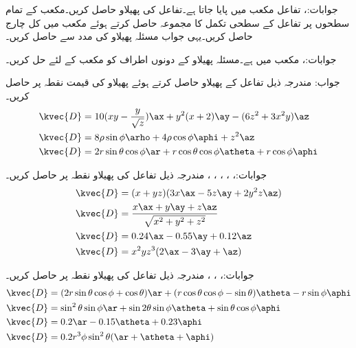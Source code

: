 جوابات:، 
تفاعل  مکعب  میں پایا جاتا ہے۔تفاعل کی پھیلاو  حاصل کریں۔مکعب کے تمام سطحوں پر تفاعل کے سطحی تکمل کا مجموعہ حاصل کرتے ہوئے مکعب میں کل چارج حاصل کریں۔یہی جواب مسئلہ پھیلاو  کی مدد سے حاصل کریں۔

جوابات:، 
مکعب  میں  ہے۔مسئلہ پھیلاو کے دونوں اطراف کو مکعب کے لئے حل کریں۔

جواب:
مندرجہ ذیل تفاعل کے پھیلاو حاصل کرتے ہوئے پھیلاو کی قیمت نقطہ  پر حاصل کریں۔
\begin{align*}
\kvec{D}&=10(xy-\frac{y}{\sqrt{z}})\ax+y^2(x+2)\ay-(6z^2+3x^2y)\az\\
\kvec{D}&=8\rho \sin \phi \arho+4\rho \cos \phi \aphi+z^2\az\\
\kvec{D}&=2 r \sin \theta \cos \phi\ar +r \cos \theta \cos \phi \atheta+r \cos \phi \aphi
\end{align*}

جوابات:، ، ، ، ، 
مندرجہ ذیل تفاعل کی پھیلاو نقطہ  پر حاصل کریں۔
\begin{align*}
\kvec{D}&=(x+yz)(3x\ax-5z\ay+2y^2z\az)\\
\kvec{D}&=\frac{x\ax+y\ay+z\az}{\sqrt{x^2+y^2+z^2}}\\
\kvec{D}&=0.24\ax-0.55\ay+0.12\az\\
\kvec{D}&=x^2yz^3(2\ax-3\ay+\az)
\end{align*}

جوابات:، ، ، 
مندرجہ ذیل تفاعل کی پھیلاو نقطہ  پر حاصل کریں۔
\begin{align*}
\kvec{D}&=(2r\sin\theta\cos\phi+\cos\theta)\ar+(r\cos\theta\cos\phi-\sin\theta)\atheta-r\sin\phi\aphi\\
\kvec{D}&=\sin^2\theta\sin\phi\ar+\sin 2\theta \sin \phi\atheta+\sin\theta\cos\phi\aphi\\
\kvec{D}&=0.2\ar-0.15\atheta+0.23\aphi\\
\kvec{D}&=0.2r^3 \phi \sin^2 \theta (\ar+\atheta+\aphi)
\end{align*}

